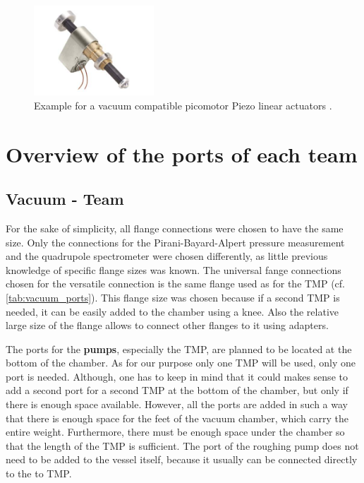 \begin{figure}[H]
    \centering
    \includegraphics[width=0.4\textwidth]{sections/imges/piezo.jpg}
    \caption{Example for a vacuum compatible picomotor Piezo linear actuators \cite{pie}.}
    \label{fig:pie}
\end{figure}




\section{Overview of the ports of each team}

\subsection{Vacuum - Team}




For the sake of simplicity, all flange connections were chosen to have the same size.
Only the connections for the Pirani-Bayard-Alpert pressure measurement and the quadrupole spectrometer were chosen differently, as little previous knowledge of specific flange sizes was known.
The universal fange connections chosen for the versatile connection is the same flange used as for the TMP (cf. \autoref{tab:vacuum_ports}).
This flange size was chosen because if a second TMP is needed, it can be easily added to the chamber using a knee.
Also the relative large size of the flange allows to connect other flanges to it using adapters.

The ports for the \textbf{pumps}, especially the TMP, are planned to be located at the bottom of the chamber.
As for our purpose only one TMP will be used, only one port is needed.
Although, one has to keep in mind that it could makes sense to add a second port for a second TMP at the bottom of the chamber, but only if there is enough space available.
However, all the ports are added in such a way that there is enough space for the feet of the vacuum chamber, which carry the entire weight.
Furthermore, there must be enough space under the chamber so that the length of the TMP is sufficient.
The port of the roughing pump does not need to be added to the vessel itself, because it usually can be connected directly to the to TMP.

